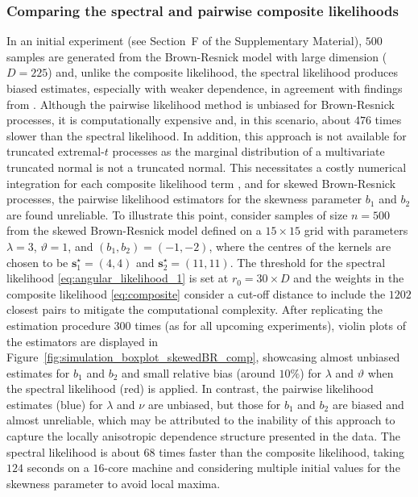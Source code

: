\documentclass[12pt]{article}
\begin{document}
\subsubsection{Comparing the spectral and pairwise composite likelihoods}

In an initial experiment (see Section~F of the Supplementary Material), $500$ samples are generated from the Brown-Resnick model with large dimension ($D=225$) and, unlike the composite likelihood, the spectral likelihood produces biased estimates, especially with weaker dependence, in agreement with findings from \citet{Engelke.etal:2015, Huser.etal:2016}. Although the pairwise likelihood method is unbiased for Brown-Resnick processes, it is computationally expensive and, in this scenario, about $476$ times slower than the spectral likelihood. In addition, this approach is not available for truncated extremal-$t$ processes as the marginal distribution of a multivariate truncated normal is not a truncated normal. This necessitates a costly numerical integration for each composite likelihood term \citep{Horrace:2005}, and for skewed Brown-Resnick processes, the pairwise likelihood estimators for the skewness parameter $b_1$ and $b_2$ are found unreliable.
%
To illustrate this point, consider samples of size $n=500$ from the skewed Brown-Resnick model defined on a $15\times15$ grid with parameters $\lambda=3$, $\vartheta=1$, and $(b_1,b_2) = (-1,-2)$, where the centres of the kernels are chosen to be $\bm s_1^\star = (4,4)$ and $\bm s_2^\star=(11,11)$. 
%
The threshold for the spectral likelihood \eqref{eq:angular_likelihood_1} is set at $r_0 = 30 \times D$ and the weights in the composite likelihood \eqref{eq:composite} consider a cut-off distance to include the $1202$ closest pairs to mitigate the computational complexity.
% 
After replicating the estimation procedure $300$ times (as for all upcoming experiments), violin plots of the estimators are displayed in Figure~\ref{fig:simulation_boxplot_skewedBR_comp}, showcasing almost unbiased estimates for $b_1$ and $b_2$ and small relative bias (around $10\%$) for $\lambda$ and $\vartheta$ when the spectral likelihood (red) is applied. 
%
In contrast, the pairwise likelihood estimates (blue) for $\lambda$ and $\nu$ are unbiased, but those for $b_1$ and $b_2$ are biased and almost unreliable, which may be attributed to the inability of this approach to capture the locally anisotropic dependence structure presented in the data. The spectral likelihood is about $68$ times faster than the composite likelihood, taking $124$ seconds on a $16$-core machine and considering multiple initial values for the skewness parameter to avoid local maxima.  
\end{document}
